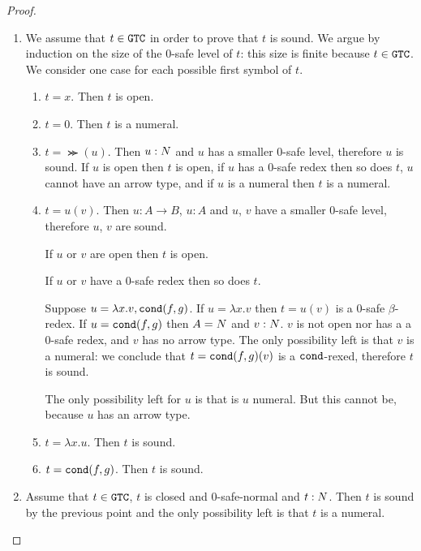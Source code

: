 \begin{proof}
\begin{enumerate}
\item
We assume that $t \in {\tt GTC}$ in order to prove that $t$ is sound.
We argue by  induction on the size of the $0$-safe level of $t$: this size is finite because $t \in {\tt GTC}$. 
We consider one case for each possible first symbol of $t$.

\begin{enumerate}
\item
$t =x$. Then $t$ is open.
\item
$t=0$. Then $t$ is a numeral.
\item
$t = \Succ(u)$. Then $u:{N}$ and $u$ has a smaller $0$-safe level, therefore $u$ is sound. If $u$ is open then
$t$ is open, if $u$ has a $0$-safe redex then so does $t$, $u$ cannot have an arrow type, and if $u$
is a numeral then $t$ is a numeral.
\item
$t=u(v)$. Then $u:A \rightarrow B$, $u:A$ and $u$, $v$ have a smaller $0$-safe level, therefore $u$,
$v$ are sound. 

If $u$ or $v$ are open then $t$ is open. 

If $u$ or $v$ have a $0$-safe redex then so does $t$.

Suppose $u = \lambda x.v, {\tt cond}(f,g)$. If $u = \lambda x.v$ then $t=u(v)$ is a $0$-safe $\beta$-redex.
If $u = {\tt cond}(f,g)$ then $A = {N}$ and $v:{N}$. $v$ is not open nor has a a $0$-safe redex, and $v$ has no
arrow type. The only possibility left is that $v$ is a numeral: we conclude that $t={\tt cond}(f,g)(v)$ is a ${\tt cond}$-rexed, therefore $t$ is sound.

The only possibility left for $u$ is that is $u$ numeral. But this cannot be, because $u$ has an arrow type.

\item
$t = \lambda x.u$. Then $t$ is sound.

\item
$t = {\tt cond}(f,g)$. Then $t$ is sound.
\end{enumerate}

\item
Assume that $t \in {\tt GTC}$, $t$ is closed and $0$-safe-normal and $t:{N}$.
Then $t$ is sound by the previous point and the only possibility left is that $t$ is 
a numeral.
\end{enumerate}
\end{proof}

\newpage
